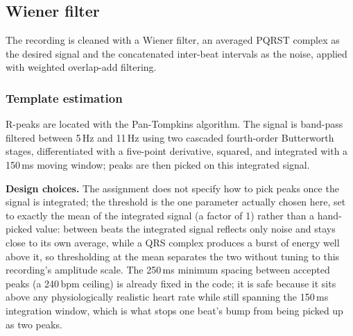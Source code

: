\documentclass[11pt,a4paper]{article}
\newcommand{\hertz}{Hz}
\newcommand{\second}{s}
\newcommand{\decibel}{dB}
\newcommand{\percent}{\%}
\newcommand{\milli}{m}
\newcommand{\SI}[2]{#1\,#2}
\begin{document}
%

\subsection{Wiener filter}
\label{sec:wiener}

The recording is cleaned with a Wiener filter, an averaged PQRST complex as the desired signal
and the concatenated inter-beat intervals as the noise, applied with weighted overlap-add
filtering.

\subsubsection{Template estimation}

R-peaks are located with the Pan-Tompkins algorithm. The signal is band-pass filtered between
\SI{5}{\hertz} and \SI{11}{\hertz} using two cascaded fourth-order Butterworth stages,
differentiated with a five-point derivative, squared, and integrated with a
\SI{150}{\milli\second} moving window; peaks are then picked on this integrated signal.

\textbf{Design choices.} The assignment does not specify how to pick peaks once the signal is
integrated; the threshold is the one parameter actually chosen here, set to exactly the mean of
the integrated signal (a factor of 1) rather than a hand-picked value: between beats the
integrated signal reflects only noise and stays close to its own average, while a QRS complex
produces a burst of energy well above it, so thresholding at the mean separates the two without
tuning to this recording's amplitude scale. The \SI{250}{\milli\second} minimum spacing between
accepted peaks (a \SI{240}{bpm} ceiling) is already fixed in the code; it is safe because it
sits above any physiologically realistic heart rate while still spanning the
\SI{150}{\milli\second} integration window, which is what stops one beat's bump from being
picked up as two peaks.
\end{document}
